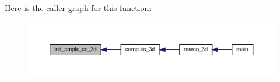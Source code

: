 Here is the caller graph for this function\+:
\nopagebreak
\begin{figure}[H]
\begin{center}
\leavevmode
\includegraphics[width=350pt]{Marco_8f90_aaf5e8f1fe701ea6d58511ac2fabcd83c_icgraph}
\end{center}
\end{figure}
\mbox{\label{Marco_8f90_a5f04384a88b1293a8d2dc26d86a77d08}} 
